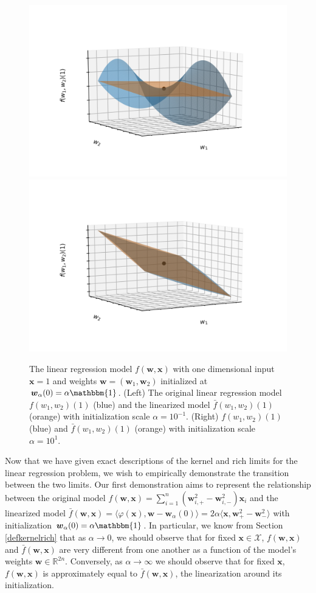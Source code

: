 \documentclass{article}
\begin{document}
\begin{figure}[H]
    \centering
    \includegraphics[width=.5\textwidth]{Imgs/Linearized_Model/visualize_linearized_0.1.png}\hfill
    \includegraphics[width=.5\textwidth]{Imgs/Linearized_Model/visualize_linearized_10.png}
    \caption{The linear regression model $f(\boldsymbol{w}, \boldsymbol{x})$ with one dimensional input $\boldsymbol{x} = 1$ and weights $\boldsymbol{w} = (\boldsymbol{w}_1, \boldsymbol{w}_2)$ initialized at $\boldsymbol{w}_{\alpha}(0) = \alpha \mathbbm{1}$. (Left) The original linear regression model $f(w_1, w_2)(1)$ (blue) and the linearized model $\bar{f}(w_1, w_2)(1)$ (orange) with initialization scale $\alpha = 10^{-1}$. (Right) $f(w_1, w_2)(1)$ (blue) and $\bar{f}(w_1, w_2)(1)$ (orange) with initialization scale $\alpha = 10^1$.}\label{img:linearization}
\end{figure}

Now that we have given exact descriptions of the kernel and rich limits for the linear regression problem, we wish to empirically demonstrate the transition between the two limits. Our first demonstration aims to represent the relationship between the original model $f(\boldsymbol{w}, \boldsymbol{x}) = \sum_{i=1}^n (\boldsymbol{w}_{i,+}^2 - \boldsymbol{w}_{i,-}^2)\boldsymbol{x}_i$ and the linearized model $\bar{f}(\boldsymbol{w}, \boldsymbol{x}) = \langle \varphi(\boldsymbol{x}), \boldsymbol{w} - \boldsymbol{w}_{\alpha}(0) \rangle = 2\alpha \langle \boldsymbol{x} , \boldsymbol{w}_+^2 -  \boldsymbol{w}_-^2\rangle$ with initialization $\boldsymbol{w}_{\alpha}(0) = \alpha \mathbbm{1}$. In particular, we know from Section \ref{defkernelrich} that as $\alpha \rightarrow 0$, we should observe that for fixed $\boldsymbol{x} \in \mathcal{X}$, $f(\boldsymbol{w}, \boldsymbol{x})$ and $\bar{f}(\boldsymbol{w}, \boldsymbol{x})$ are very different from one another as a function of the model's weights $\boldsymbol{w} \in \mathbb{R}^{2n}$. Conversely, as $\alpha \rightarrow \infty$ we should observe that for fixed $\boldsymbol{x}$, $f(\boldsymbol{w}, \boldsymbol{x})$ is approximately equal to  $\bar{f}(\boldsymbol{w}, \boldsymbol{x})$, the linearization around its initialization.
\end{document}
